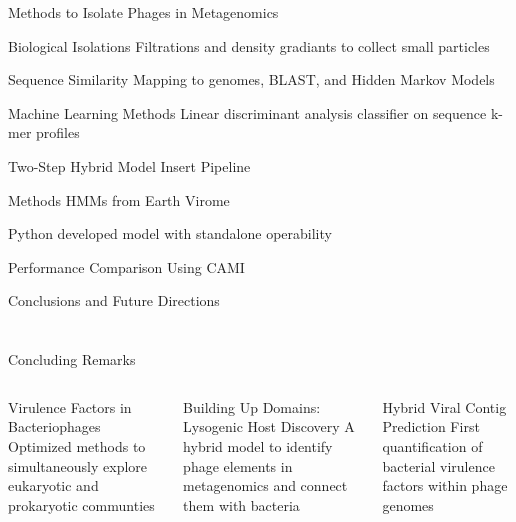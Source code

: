 \documentclass[11pt, xcolor=table]{beamer}
\begin{document}
  \begin{frame}{Methods to Isolate Phages in Metagenomics}
  \begin{block}{Biological Isolations}
  Filtrations and density gradiants to collect small particles
  \end{block}
  \begin{block}{Sequence Similarity}
  Mapping to genomes, BLAST, and Hidden Markov Models
  \end{block}
  \begin{block}{Machine Learning Methods}
  Linear discriminant analysis classifier on sequence k-mer profiles
  \end{block}
  \end{frame}
  \begin{frame}{Two-Step Hybrid Model}
  Insert Pipeline
  
  \end{frame}
  \begin{frame}{Methods}
  HMMs from Earth Virome
  
  Python developed model with standalone operability
  
  \end{frame}
  \begin{frame}{Performance Comparison Using CAMI}

	\end{frame}
	
	\begin{frame}{Conclusions and Future Directions}

	\end{frame}
\section{}
	
	\begin{frame}{Concluding Remarks}
	\begin{columns}
	\begin{block}{Virulence Factors in Bacteriophages}
	Optimized methods to simultaneously explore eukaryotic and prokaryotic communties
	\end{block}
	\begin{block}{Building Up Domains: Lysogenic Host Discovery}
	A hybrid model to identify phage elements in metagenomics and connect them with bacteria
	\end{block}
	\begin{block}{Hybrid Viral Contig Prediction}
	First quantification of bacterial virulence factors within phage genomes
	\end{block}
	
	\end{columns}
	
	\end{frame}
	
\end{document}

